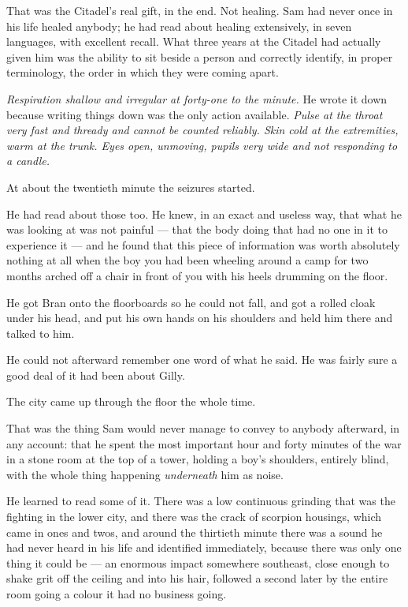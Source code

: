 That was the Citadel’s real gift, in the end. Not healing. Sam had never once in his life healed anybody; he had read about healing extensively, in seven languages, with excellent recall. What three years at the Citadel had actually given him was the ability to sit beside a person and correctly identify, in proper terminology, the order in which they were coming apart.

\textit{Respiration shallow and irregular at forty-one to the minute.} He wrote it down because writing things down was the only action available. \textit{Pulse at the throat very fast and thready and cannot be counted reliably. Skin cold at the extremities, warm at the trunk. Eyes open, unmoving, pupils very wide and not responding to a candle.}

At about the twentieth minute the seizures started.

He had read about those too. He knew, in an exact and useless way, that what he was looking at was not painful — that the body doing that had no one in it to experience it — and he found that this piece of information was worth absolutely nothing at all when the boy you had been wheeling around a camp for two months arched off a chair in front of you with his heels drumming on the floor.

He got Bran onto the floorboards so he could not fall, and got a rolled cloak under his head, and put his own hands on his shoulders and held him there and talked to him.

He could not afterward remember one word of what he said. He was fairly sure a good deal of it had been about Gilly.

\sceneBreak

The city came up through the floor the whole time.

That was the thing Sam would never manage to convey to anybody afterward, in any account: that he spent the most important hour and forty minutes of the war in a stone room at the top of a tower, holding a boy’s shoulders, entirely blind, with the whole thing happening \textit{underneath} him as noise.

He learned to read some of it. There was a low continuous grinding that was the fighting in the lower city, and there was the crack of scorpion housings, which came in ones and twos, and around the thirtieth minute there was a sound he had never heard in his life and identified immediately, because there was only one thing it could be — an enormous impact somewhere southeast, close enough to shake grit off the ceiling and into his hair, followed a second later by the entire room going a colour it had no business going.

